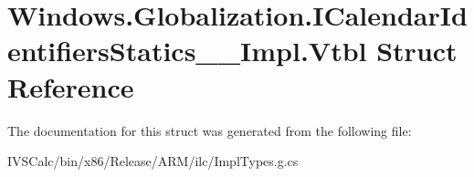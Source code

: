 \hypertarget{struct_windows_1_1_globalization_1_1_i_calendar_identifiers_statics_____impl_1_1_vtbl}{}\section{Windows.\+Globalization.\+I\+Calendar\+Identifiers\+Statics\+\_\+\+\_\+\+Impl.\+Vtbl Struct Reference}
\label{struct_windows_1_1_globalization_1_1_i_calendar_identifiers_statics_____impl_1_1_vtbl}


The documentation for this struct was generated from the following file\+:\begin{DoxyCompactItemize}
\item 
I\+V\+S\+Calc/bin/x86/\+Release/\+A\+R\+M/ilc/Impl\+Types.\+g.\+cs\end{DoxyCompactItemize}
